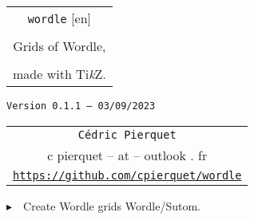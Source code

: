 \documentclass[english,a4paper,11pt]{article}
\def\TPversion{0.1.1}
\def\TPdate{03/09/2023}
\begin{document}
\setlength{\aweboxleftmargin}{0.07\linewidth}
\setlength{\aweboxcontentwidth}{0.93\linewidth}
\setlength{\aweboxvskip}{8pt}

\pagestyle{fancy}

\thispagestyle{empty}

\vspace{2cm}

\begin{center}
	\begin{minipage}{0.75\linewidth}
	\begin{tcolorbox}[colframe=yellow,colback=yellow!15]
		\begin{center}
			\begin{tabular}{c}
				{\Huge \texttt{wordle} [en]}\\
				\\
				{\LARGE Grids of Wordle,} \\
				\\
				{\LARGE made with \textsf{Ti\textit{k}Z}.} \\
			\end{tabular}
			
			\bigskip
			
			{\small \texttt{Version \TPversion{} -- \TPdate}}
		\end{center}
	\end{tcolorbox}
\end{minipage}
\end{center}

\begin{center}
	\begin{tabular}{c}
	\texttt{Cédric Pierquet}\\
	{\ttfamily c pierquet -- at -- outlook . fr}\\
	\texttt{\url{https://github.com/cpierquet/wordle}}
\end{tabular}
\end{center}

\vspace{0.25cm}

{$\blacktriangleright$~~Create Wordle grids Wordle/Sutom\footnotemark{}.}

\vspace{0.25cm}
\end{document}
